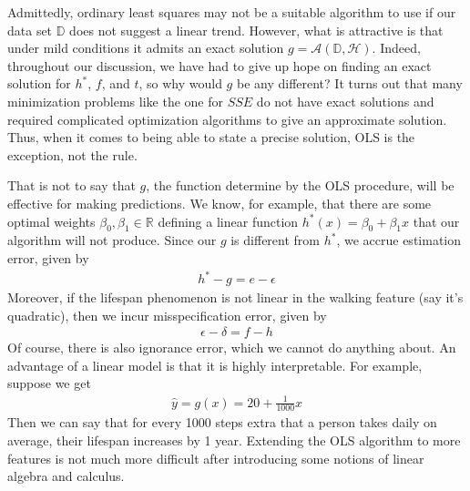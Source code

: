 \documentclass[12pt]{article}
\begin{document}
	 Admittedly, ordinary least squares may not be a suitable algorithm to use
	 if our data set $\mathbb{D}$ does not suggest a linear trend. However, what is
	 attractive is that under mild conditions it admits an exact solution
	 $g=\mathcal{A}(\mathbb{D}, \mathcal{H})$. Indeed, throughout our discussion,
	 we have had to give up hope on finding an exact solution for $h^*$,
	 $f$, and $t$, so why would $g$ be any different? It turns out that many
	 minimization problems like the one for $SSE$ do not have exact solutions
	 and required complicated optimization algorithms to give an approximate
	 solution. Thus, when it comes to being able to state a precise solution,
	 OLS is the exception, not the rule.
	 
	 That is not to say that $g$, the function determine by the OLS procedure,
	 will be effective for making predictions. We know, for example, that there are
	 some optimal weights $\beta_0,\beta_1\in\mathbb{R}$ defining a linear function
	 $h^*(x) = \beta_0+\beta_1 x$ that our algorithm will not produce.
	 Since our $g$ is different from $h^*$, we accrue estimation error,
	 given by
	 \begin{align*}
	 	h^*  - g= e - \epsilon
	 \end{align*}
	 Moreover, if the lifespan phenomenon is not linear in the walking feature
	 (say it's quadratic), then we incur misspecification error, given by
	 \begin{align*}
	 	\epsilon - \delta = f - h
	 \end{align*}
	 Of course, there is also ignorance error, which we cannot do anything about.
	 An advantage of a linear model is that it is highly interpretable. For example, suppose
	 we get
	 \begin{align*}
	 	\hat{y} = g(x) = 20 + \frac{1}{1000}x
	 \end{align*}
	 Then we can say that for every 1000 steps extra that a person takes daily
	 on average, their lifespan increases by 1 year. Extending the OLS algorithm
	 to more features is not much more difficult after introducing some notions
	 of linear algebra and calculus.
\end{document}
